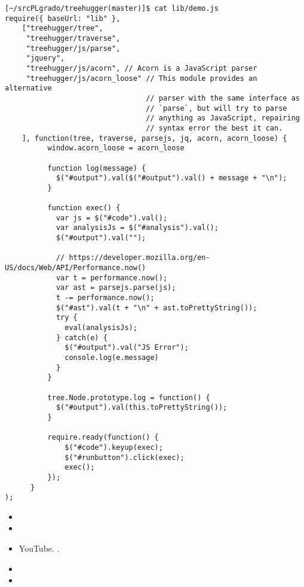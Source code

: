 \begin{verbatim}
[~/srcPLgrado/treehugger(master)]$ cat lib/demo.js 
require({ baseUrl: "lib" }, 
    ["treehugger/tree", 
     "treehugger/traverse", 
     "treehugger/js/parse", 
     "jquery",
     "treehugger/js/acorn", // Acorn is a JavaScript parser
     "treehugger/js/acorn_loose" // This module provides an alternative 
                                 // parser with the same interface as 
                                 // `parse`, but will try to parse
                                 // anything as JavaScript, repairing 
                                 // syntax error the best it can.
    ], function(tree, traverse, parsejs, jq, acorn, acorn_loose) {
          window.acorn_loose = acorn_loose

          function log(message) {
            $("#output").val($("#output").val() + message + "\n");
          }

          function exec() {
            var js = $("#code").val();
            var analysisJs = $("#analysis").val();
            $("#output").val("");   
            
            // https://developer.mozilla.org/en-US/docs/Web/API/Performance.now()
            var t = performance.now(); 
            var ast = parsejs.parse(js);
            t -= performance.now();
            $("#ast").val(t + "\n" + ast.toPrettyString());
            try {
              eval(analysisJs);
            } catch(e) {
              $("#output").val("JS Error");
              console.log(e.message)
            }
          }

          tree.Node.prototype.log = function() {
            $("#output").val(this.toPrettyString());
          }

          require.ready(function() {
              $("#code").keyup(exec);
              $("#runbutton").click(exec);
              exec();
          });
      }
);
\end{verbatim}

\begin{itemize}
\item
{}
\item
{}
\item
{}
YouTube. 
.
\item
{}
\item
{}
\end{itemize}


